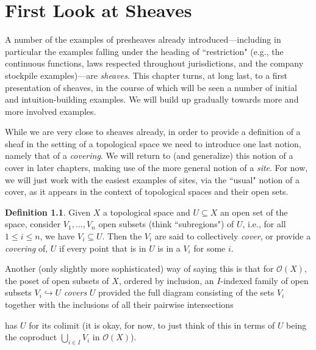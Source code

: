 \documentclass[a4paper]{book}
\theoremstyle{definition}
\theoremstyle{definition}
\newtheorem{definition}{Definition}[section]
\theoremstyle{definition}
\theoremstyle{theorem}
\theoremstyle{definition}
\begin{document}
\chapter{First Look at Sheaves}
		A number of the examples of presheaves already introduced---including in particular the examples falling under the heading of ``restriction" (e.g., the continuous functions,  laws respected throughout jurisdictions, and the company stockpile examples)---are \textit{sheaves}. This chapter turns, at long last, to a first presentation of sheaves, in the course of which will be seen a number of initial and intuition-building examples. We will build up gradually towards more and more involved examples. \par 
		While we are very close to sheaves already, in order to provide a definition of a sheaf in the setting of a topological space we need to introduce one last notion, namely that of a \textit{covering}. We will return to (and generalize) this notion of a cover in later chapters, making use of the more general notion of a \textit{site}. For now, we will just work with the easiest examples of sites, via the ``usual" notion of a cover, as it appears in the context of topological spaces and their open sets. 
		\begin{definition}
			Given $X$ a topological space and $U \subseteq  X$ an open set of the space, consider $V_1,\dots, V_n$ open subsets (think ``subregions") of $U$, i.e., for all $1 \leq i \leq n$, we have $V_i \subseteq  U$. Then the $V_i$ are said to collectively \textit{cover}, or provide a \textit{covering} of, $U$ if every point that is in $U$ is in a $V_i$ for some $i$. 
		\end{definition} \noindent 
		Another (only slightly more sophisticated) way of saying this is that for $\mathscr{O}(X)$, the poset of open subsets of $X$, ordered by inclusion, an $I$-indexed family of open subsets $V_i \hookrightarrow U$ \textit{covers} $U$ provided the full diagram consisting of the sets $V_i$ together with the inclusions of all their pairwise intersections 
		\begin{center} 
		\end{center} 
		has $U$ for its colimit (it is okay, for now, to just think of this in terms of $U$ being the coproduct $\bigcup_{i \in I} V_i$ in $\mathscr{O}(X)$). \par 
\end{document}
